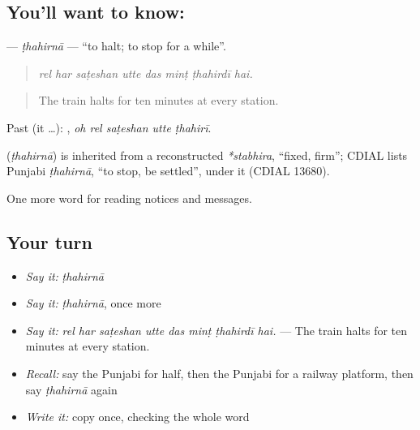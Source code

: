 \subsection*{You'll want to know: }
\textbf{} — \emph{ṭhahirnā} — \textquotedblleft{}to halt; to stop for a while\textquotedblright{}.

\begin{quote}
       
\end{quote}

\begin{quote}
\emph{rel har saṭeshan utte das minṭ ṭhahirdī hai.}
\end{quote}

\begin{quote}
The train halts for ten minutes at every station.
\end{quote}

Past (it …):     , \emph{oh rel saṭeshan utte ṭhahirī}.

\begin{cousinweb}
\textbf{} (\emph{ṭhahirnā}) is inherited from a reconstructed \emph{*stabhira}, \textquotedblleft{}fixed, firm\textquotedblright{}; CDIAL lists Punjabi \emph{ṭhahirnā}, \textquotedblleft{}to stop, be settled\textquotedblright{}, under it (CDIAL 13680).
\end{cousinweb}

\begin{grammarlens}[title={What you've built}]
One more word for reading notices and messages.
\end{grammarlens}

\subsection*{Your turn}
\begin{itemize}
\raggedright
  \item \emph{Say it:} \emph{ṭhahirnā}
  \item \emph{Say it:} \emph{ṭhahirnā}, once more
  \item \emph{Say it:} \emph{rel har saṭeshan utte das minṭ ṭhahirdī hai.} — The train halts for ten minutes at every station.
  \item \emph{Recall:} say the Punjabi for half, then the Punjabi for a railway platform, then say \emph{ṭhahirnā} again
  \item \emph{Write it:} copy \textbf{} once, checking the whole word
\end{itemize}

